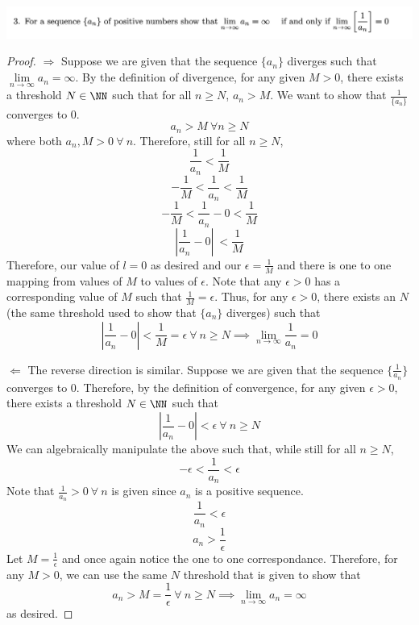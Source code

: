 \documentclass[12pt]{scrartcl}
\begin{document}
\newpage

\includegraphics[width=15cm]{3.png}

\begin{proof}

  \hfill
  
$\Longrightarrow$ Suppose we are given that the sequence $\{a_n\}$ diverges such that 
$\underset{n\to\infty}{\lim}a_n = \infty$. By the definition of divergence, 
for any given $M > 0$, there exists a threshold $N \in \NN$ such that for all $n \geq N$, 
$a_n > M$. We want to show that $\frac{1}{\{a_n\}}$ converges to $0$.
\[a_n > M \ \forall n \geq N\]
where both $a_n, M > 0 \ \forall \ n$. Therefore, still for all $n \geq N$, 
\[\frac{1}{a_n} < \frac{1}{M}\]
\[-\frac{1}{M} < \frac{1}{a_n} < \frac{1}{M}\]
\[-\frac{1}{M} < \frac{1}{a_n} - 0 < \frac{1}{M}\]
\[|\frac{1}{a_n} - 0|\ < \frac{1}{M}\]
Therefore, our value of $l = 0$ as desired and our $\epsilon = \frac{1}{M}$ and there is one to one mapping from values of $M$ to 
values of $\epsilon$. Note that any $\epsilon > 0$ has a corresponding value of $M$ such that $\frac{1}{M} = \epsilon$. 
Thus, for any $\epsilon > 0$, there exists an $N$ (the same threshold used to show that $\{a_n\}$ diverges)
such that
\[|\frac{1}{a_n} - 0| < \frac{1}{M} = \epsilon \ \forall \ n \geq N \implies \lim_{n\to\infty}\frac{1}{a_n} = 0\]

\hfill

$\Longleftarrow$ The reverse direction is similar. Suppose we are given that the sequence $\{\frac{1}{a_n}\}$ converges 
to $0$. Therefore, by the definition of convergence, for any given $\epsilon > 0$, there exists a threshold 
$N \in \NN$ such that
\[|\frac{1}{a_n} - 0| < \epsilon \ \forall \ n \geq N\]
We can algebraically manipulate the above such that, while still for all $n \geq N$, 
\[-\epsilon < \frac{1}{a_n} < \epsilon\]
Note that $\frac{1}{a_n} > 0 \ \forall \ n$ is given since $a_n$ is a positive sequence. 
\[\frac{1}{a_n} < \epsilon\]
\[a_n > \frac{1}{\epsilon}\]
Let $M = \frac{1}{\epsilon}$ and once again notice the one to one correspondance. Therefore, 
for any $M > 0$, we can use the same $N$ threshold that is given to show that 
\[a_n > M = \frac{1}{\epsilon} \ \forall \ n \geq N \implies \lim_{n\to\infty}a_n = \infty\]
as desired.
\end{proof}

\newpage
\end{document}
